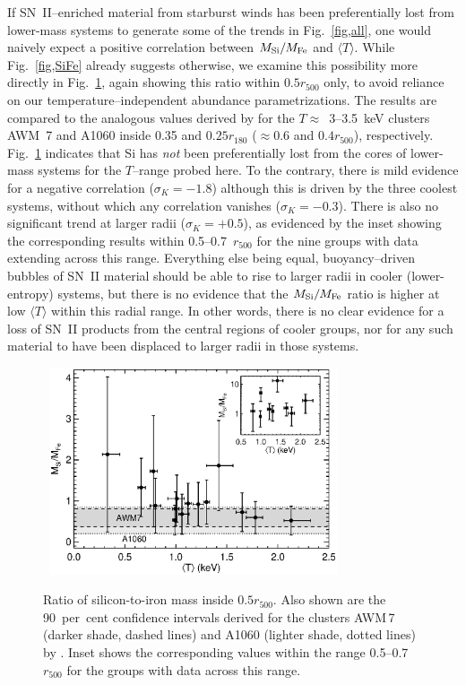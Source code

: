 \documentclass[useAMS,usenatbib]{mn2e}
\begin{document}
If SN~II--enriched material from starburst winds has been
preferentially lost from lower-mass systems to generate some of the
trends in Fig.~\ref{fig,all}, one would naively expect a positive
correlation between $M_{\rm Si}/M_{\rm Fe}$ and $\langle T \rangle$.
While Fig.~\ref{fig,SiFe} already suggests otherwise, we examine this
possibility more directly in Fig.~\ref{fig,Fe_Si_T}, again showing
this ratio within $0.5 r_{500}$ only, to avoid reliance on our
temperature--independent abundance parametrizations.  The results are
compared to the analogous values derived by \citet{sato07} for the
$T\approx $~3--3.5~keV clusters AWM~7 and A1060 inside 0.35 and
$0.25r_{180}$ ($\approx 0.6$ and $0.4r_{500}$),
respectively. Fig.~\ref{fig,Fe_Si_T} indicates that Si has {\em not}
been preferentially lost from the cores of lower-mass systems for the
$T$--range probed here. To the contrary, there is mild evidence for a
negative correlation ($\sigma_K=-1.8$) although this is driven by the
three coolest systems, without which any correlation vanishes
($\sigma_K=-0.3$). There is also no significant trend at larger radii
($\sigma_K=+0.5$), as evidenced by the inset showing the corresponding
results within 0.5--0.7~$r_{500}$ for the nine groups with data
extending across this range. Everything else being equal,
buoyancy--driven bubbles of SN~II material should be able to rise to
larger radii in cooler (lower-entropy) systems, but there is no
evidence that the $M_{\rm Si}/M_{\rm Fe}$ ratio is higher at low
$\langle T\rangle$ within this radial range. In other words, there is
no clear evidence for a loss of SN~II products from the central
regions of cooler groups, nor for any such material to have been
displaced to larger radii in those systems.


\begin{figure} 
\mbox{\hspace{-2mm} 
\includegraphics[width=85mm]{fig17.eps}}
\caption{Ratio of silicon-to-iron mass inside $0.5 r_{500}$. Also
  shown are the 90~per~cent confidence intervals derived for the
  clusters AWM\,7 (darker shade, dashed lines) and A1060 (lighter
  shade, dotted lines) by \citet{sato07}. Inset shows the
  corresponding values within the range 0.5--0.7~$r_{500}$ for the
  groups with data across this range.}
\label{fig,Fe_Si_T} 
\end{figure} 
\end{document}
